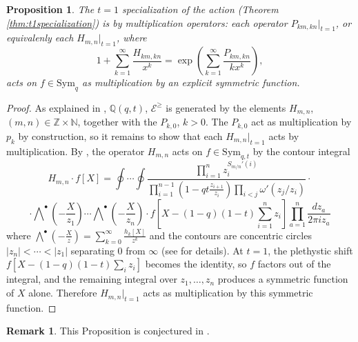 \documentclass{amsart}
\numberwithin{equation}{section}
\newtheorem{proposition}[lemma]{Proposition}%
\theoremstyle{definition}
\newtheorem{remark}[lemma]{Remark}%
\def\Sym{{\mathrm{Sym}}}
\newcommand{\cE}{\mathcal{E}}
\newcommand{\N}{{\mathbb N}}
\newcommand{\Z}{{\mathbb Z}}
\newcommand{\Q}{{\mathbb Q}}
\begin{document}
\begin{proposition}\label{prop:multops}
The $t=1$ specialization of the action (Theorem \ref{thm:t1specialization}) is by multiplication operators: each operator $P_{km,kn}|_{t=1}$, or equivalenly each $H_{m,n}|_{t=1}$, 
where $$1+\sum_{k=1}^\infty\frac{H_{km,kn}}{x^k}=\exp\left(\sum_{k=1}^\infty\frac{P_{km,kn}}{kx^k}\right),$$
acts on $f \in \Sym_q$ as multiplication by an explicit symmetric function.
\end{proposition}
\begin{proof}
As explained in \cite{BS1,NegutShuffle}, $\Q(q,t)$, $\cE^\geq$ is generated by the elements $H_{m,n}$, $(m,n)\in\Z\times\N$, together with the $P_{k,0}$, $k>0$. The $P_{k,0}$ act as multiplication by $p_k$ by construction, so it remains to show that each $H_{m,n}|_{t=1}$ acts by multiplication. By \cite[Theorem 2.15]{NegutOps}, the operator $H_{m,n}$ acts on $f\in\Sym_{q,t}$ by the contour integral
$$H_{m,n}\cdot f[X]=\oint\cdots\oint\frac{\prod_{i=1}^n z_i^{S_{m/n}'(i)}}{\prod_{i=1}^{n-1}(1-qt\frac{z_{i+1}}{z_i})\prod_{i<j}\omega'(z_j/z_i)}\cdot$$
$$\cdot\bigwedge\nolimits^\bullet\left(-\frac{X}{z_1}\right)\cdots \bigwedge\nolimits^\bullet \left(-\frac{X}{z_n}\right)\cdot
f\left[X-(1-q)(1-t)\sum_{i=1}^n z_i\right]\prod_{a=1}^n\frac{dz_a}{2\pi iz_a}$$
where $\bigwedge^\bullet(-\frac{X}{z})=\sum_{k=0}^\infty \frac{h_k[X]}{z^k}$ and the contours are concentric circles $|z_n|<\cdots<|z_1|$ separating $0$ from $\infty$ (see \cite{NegutOps, NegutKTheory} for details). At $t=1$, the plethystic shift $f[X-(1-q)(1-t)\sum_i z_i]$ becomes the identity, so $f$ factors out of the integral, and the remaining integral over $z_1,\ldots,z_n$ produces a symmetric function of $X$ alone. Therefore $H_{m,n}|_{t=1}$ acts as multiplication by this symmetric function.
\end{proof}
\begin{remark}
This Proposition is conjectured in \cite{BergeronNotes,BergeronSurvey}. 
\end{remark}
\end{document}
